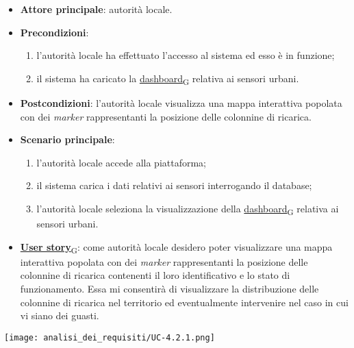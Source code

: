 \begin{itemize}
	\item \textbf{Attore principale}: autorità locale.
	\item \textbf{Precondizioni}:
	      \begin{enumerate}
		      \item l'autorità locale ha effettuato l'accesso al sistema ed esso è in funzione;
		      \item il sistema ha caricato la \href{https://7last.github.io/docs/pb/documentazione-interna/glossario\#dashboard}{dashboard\textsubscript{G}} relativa ai sensori urbani.
	      \end{enumerate}
	\item \textbf{Postcondizioni}: l'autorità locale visualizza una mappa interattiva popolata con dei \textit{marker} rappresentanti la posizione delle colonnine di ricarica.
	\item \textbf{Scenario principale}:
	      \begin{enumerate}
		      \item l'autorità locale accede alla piattaforma;
		      \item il sistema carica i dati relativi ai sensori interrogando il database;
		      \item l'autorità locale seleziona la visualizzazione della \href{https://7last.github.io/docs/pb/documentazione-interna/glossario\#dashboard}{dashboard\textsubscript{G}} relativa ai sensori urbani.
	      \end{enumerate}
	\item \href{https://7last.github.io/docs/pb/documentazione-interna/glossario\#user-story}{\textbf{User story}\textsubscript{G}}:
	      come autorità locale desidero poter visualizzare una mappa interattiva popolata con dei \textit{marker} rappresentanti la posizione delle colonnine di ricarica
	      contenenti il loro identificativo e lo stato di funzionamento. Essa mi consentirà di visualizzare la distribuzione delle colonnine di ricarica nel territorio
	      ed eventualmente intervenire nel caso in cui vi siano dei guasti.
\end{itemize}
\begin{center}
	\texttt{[image: analisi\_dei\_requisiti/UC-4.2.1.png]}
\end{center}


